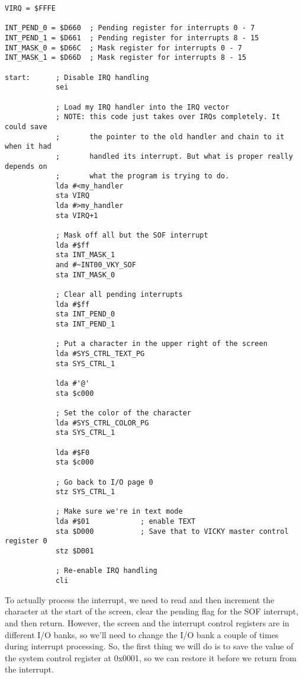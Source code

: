 \begin{verbatim}
VIRQ = $FFFE

INT_PEND_0 = $D660  ; Pending register for interrupts 0 - 7
INT_PEND_1 = $D661  ; Pending register for interrupts 8 - 15
INT_MASK_0 = $D66C  ; Mask register for interrupts 0 - 7
INT_MASK_1 = $D66D  ; Mask register for interrupts 8 - 15

start:      ; Disable IRQ handling
            sei

            ; Load my IRQ handler into the IRQ vector
            ; NOTE: this code just takes over IRQs completely. It could save
            ;       the pointer to the old handler and chain to it when it had
            ;       handled its interrupt. But what is proper really depends on
            ;       what the program is trying to do.
            lda #<my_handler
            sta VIRQ
            lda #>my_handler
            sta VIRQ+1

            ; Mask off all but the SOF interrupt
            lda #$ff
            sta INT_MASK_1
            and #~INT00_VKY_SOF
            sta INT_MASK_0

            ; Clear all pending interrupts
            lda #$ff
            sta INT_PEND_0
            sta INT_PEND_1

            ; Put a character in the upper right of the screen
            lda #SYS_CTRL_TEXT_PG
            sta SYS_CTRL_1

            lda #'@'
            sta $c000

            ; Set the color of the character
            lda #SYS_CTRL_COLOR_PG
            sta SYS_CTRL_1

            lda #$F0
            sta $c000

            ; Go back to I/O page 0
            stz SYS_CTRL_1

            ; Make sure we're in text mode
            lda #$01            ; enable TEXT
            sta $D000           ; Save that to VICKY master control register 0
            stz $D001

            ; Re-enable IRQ handling
            cli
\end{verbatim}

To actually process the interrupt, we need to read and then increment the character at the start of the screen, clear the pending flag for the SOF interrupt, and then return. However, the screen and the interrupt control registers are in different I/O banks, so we'll need to change the I/O bank a couple of times during interrupt processing. So, the first thing we will do is to save the value of the system control register at 0x0001, so we can restore it before we return from the interrupt.

